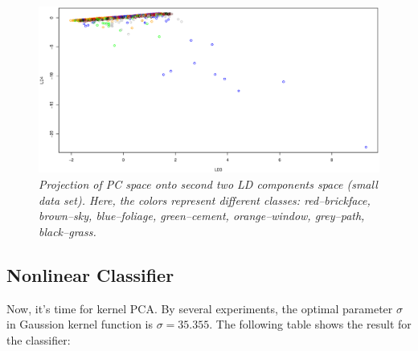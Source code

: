 \documentclass{article}
\begin{document}
\begin{figure}[htp]
\centering
\includegraphics[width=12.1cm]{small_pcalda_LD34_train.eps}
\caption{\textit{Projection of PC space onto second two LD components space (small data set). Here, the colors represent different classes: red--brickface, brown--sky, 
blue--foliage, green--cement, orange--window, grey--path, black--grass.}}
\end{figure}


\subsection{Nonlinear Classifier}

Now, it's time for kernel PCA. By several experiments, the optimal parameter $\sigma$ in Gaussion kernel function is $\sigma=35.355$. 
The following table shows the result for the classifier:

 
\end{document}
